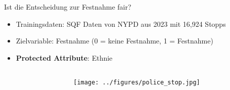 \documentclass[aspectratio=169]{beamer}
\begin{document}
\begin{frame}{Ist die Entscheidung zur Festnahme fair?}
    \begin{itemize}
        \item Trainingsdaten: SQF Daten von NYPD aus 2023 mit 16,924 Stopps
        \item Zielvariable: Festnahme (0 = keine Festnahme, 1 = Festnahme) 
        \item \textbf{Protected Attribute}: Ethnie
    \end{itemize}

    \vspace{0.5cm} %

    \begin{columns}[c] %
        \begin{column}{0.5\textwidth}
            \centering
        \end{column}

        \begin{column}{0.5\textwidth}
            \centering
            \texttt{[image: ../figures/police\_stop.jpg]}
        \end{column}
    \end{columns}
\end{frame}
\end{document}
